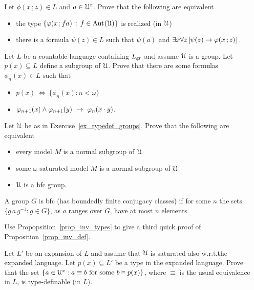 \begin{exercise}\label{ex_ak_definibilita}
  Let $\phi(x\,;z)\in L$ and $a\in\EuScript U^z$.
  Prove that the following are equivalent
  \begin{itemize}
  \item[1.] the type $\{\varphi(x\,;fa)\,:\,f\in{\rm Aut\kern.15ex}(\EuScript U)\}$ is realized (in $\EuScript U$)
  \item[2.] there is a formula $\psi(z)\in L$ such that  $\psi(a)$ and $\exists x\forall z\,[\psi(z)\rightarrow\varphi(x\,;z)]$.
  \end{itemize}  
\end{exercise}

\begin{exercise}\label{ex_typedef_groups}
  Let $L$ be a countable language containing $L_{\rm gr}$ and assume $\EuScript U$ is a group.
  Let $p(x)\subseteq L$ define a subgroup of $\EuScript U$.
  Prove that there are some formulas $\phi_n(x)\in L$ such that 
  \begin{itemize}
  \item[1.] $p(x)\ \iff\ \{\phi_n(x):n<\omega\}$
  \item[2.] $\phi_{n+1}(x)\wedge\phi_{n+1}(y)\ \imp\ \phi_n(x\cdot y)$.
  \end{itemize}
\end{exercise}

\begin{exercise}\label{ex_bfc_groups}
  Let $\EuScript U$ be as in Exercise~\ref{ex_typedef_groups}.
  Prove that the following are equivalent
  \begin{itemize}
    \item[1.] every model $M$ is a normal subgroup of $\EuScript U$
    \item[2.] some $\omega$-saturated model $M$ is a normal subgroup of $\EuScript U$
    \item[3.] $\EuScript U$ is a {\sc bfc} group.
  \end{itemize}
  A group $G$ is {\sc bfc} (has boundedly finite conjugacy classes) if for some $n$ the sets $\{g\,a\,g^{-1}:g\in G\}$, as $a$ ranges over $G$, have at most $n$ elements. 
\end{exercise}

\begin{exercise}\label{ex_third_proof}
  Use Propopsition~\ref{prop_inv_types} to give a third quick proof of Proposition~\ref{prop_inv_def}.
\end{exercise}

\begin{exercise}
  Let $L'$ be an expansion of $L$ and assume that $\EuScript U$ is saturated also w.r.t.\@ the expanded language.
  Let $p(x)\subseteq L'$ be a type in the expanded language.
  Prove that the set $\{ a\in\EuScript U^x : a\equiv b \textrm{ for some }b\vDash p(x)\}$, where $\equiv$ is the usual equivalence in $L$, is type-definable (in $L$).
\end{exercise}
